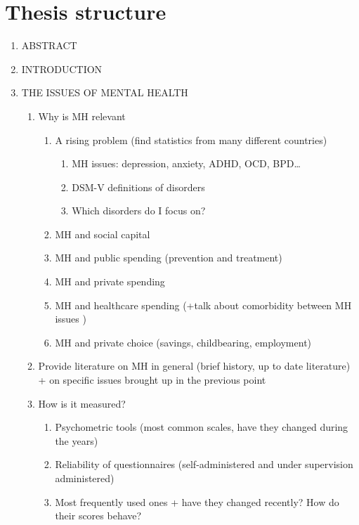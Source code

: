 \documentclass{article}
\begin{document}
\section{Thesis structure}

\begin{enumerate}
    \item ABSTRACT

    \item INTRODUCTION

    \item THE ISSUES OF MENTAL HEALTH 
    \begin{enumerate}
        \item Why is MH relevant
        \begin{enumerate}
            \item A rising problem (find statistics from many different countries)
            \begin{enumerate}
                \item MH issues: depression, anxiety, ADHD, OCD, BPD\dots
                \item DSM-V definitions of disorders
                \item Which disorders do I focus on?
            \end{enumerate}
            \item MH and social capital
            \item MH and public spending (prevention and treatment)
            \item MH and private spending
            \item MH and healthcare spending (+talk about comorbidity between MH issues )
            \item MH and private choice (savings, childbearing, employment)
        \end{enumerate}
        \item Provide literature on MH in general (brief history, up to date literature) + on specific issues brought up in the previous point
        \item How is it measured? 
        \begin{enumerate}
            \item Psychometric tools (most common scales, have they changed during the years)
            \item Reliability of questionnaires (self-administered and under supervision administered)
            \item Most frequently used ones + have they changed recently? How do their scores behave?
        \end{enumerate}
    \end{enumerate}


\end{enumerate}
\end{document}
